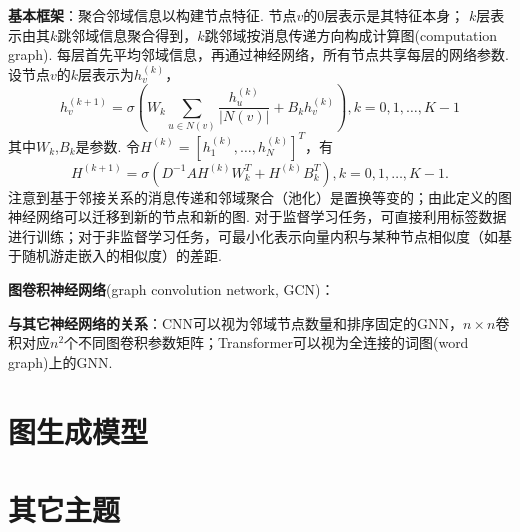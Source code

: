 \par \textbf{基本框架}：聚合邻域信息以构建节点特征. 节点$v$的0层表示是其特征本身； $k$层表示由其$k$跳邻域信息聚合得到，$k$跳邻域按消息传递方向构成计算图(computation graph). 每层首先平均邻域信息，再通过神经网络，所有节点共享每层的网络参数. 设节点$v$的$k$层表示为$h_v^{(k)}$，
\begin{equation}
    h_v^{(k+1)}=\sigma(W_k\sum_{u\in N(v)}\frac{h_u^{(k)}}{\vert N(v)\vert}+B_k h_v^{(k)}), k=0,1,\dots,K-1
\end{equation}
其中$W_k$,$B_k$是参数. 令$H^{(k)}=[h_1^{(k)},\dots, h_N^{(k)}]^T$，有
\begin{equation}
    H^{(k+1)}=\sigma(D^{-1}AH^{(k)}W_k^T+H^{(k)}B_k^T), k=0,1,\dots,K-1.
\end{equation}
注意到基于邻接关系的消息传递和邻域聚合（池化）是置换等变的；由此定义的图神经网络可以迁移到新的节点和新的图. 对于监督学习任务，可直接利用标签数据进行训练；对于非监督学习任务，可最小化表示向量内积与某种节点相似度（如基于随机游走嵌入的相似度）的差距.

\par \textbf{图卷积神经网络}(graph convolution network, GCN)： 

\par \textbf{与其它神经网络的关系}：CNN可以视为邻域节点数量和排序固定的GNN，$n\times n$卷积对应$n^2$个不同图卷积参数矩阵；Transformer可以视为全连接的词图(word graph)上的GNN.


\section{图生成模型}


\section{其它主题}